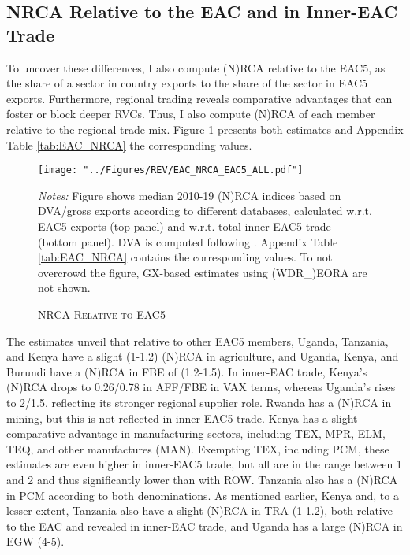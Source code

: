 \documentclass[a4paper]{article}
\begin{document}
\subsection{NRCA Relative to the EAC and in Inner-EAC Trade}

To uncover these differences, I also compute (N)RCA relative to the EAC5, as the share of a sector in country exports to the share of the sector in EAC5 exports. Furthermore, regional trading reveals comparative advantages that can foster or block deeper RVCs. Thus, I also compute (N)RCA of each member relative to the regional trade mix. Figure \ref{fig:EAC_NRCA} presents both estimates and Appendix Table \ref{tab:EAC_NRCA} the corresponding values. 

\begin{figure}[h!]
\centering
\caption{\label{fig:EAC_NRCA}\textsc{NRCA Relative to EAC5}}
\texttt{[image: "../Figures/REV/EAC\_NRCA\_EAC5\_ALL.pdf"]} \\
\raggedright
\scriptsize
\emph{Notes:} Figure shows median 2010-19 (N)RCA indices based on DVA/gross exports according to different databases, calculated w.r.t. EAC5 exports (top panel) and w.r.t. total inner EAC5 trade (bottom panel). DVA is computed following \citet{borin2019measuring}. Appendix Table \ref{tab:EAC_NRCA} contains the corresponding values. To not overcrowd the figure, GX-based estimates using (WDR\_)EORA are not shown.
\end{figure}
\FloatBarrier

The estimates unveil that relative to other EAC5 members, Uganda, Tanzania, and Kenya have a slight (1-1.2) (N)RCA in agriculture, and Uganda, Kenya, and Burundi have a (N)RCA in FBE of (1.2-1.5). In inner-EAC trade, Kenya's (N)RCA drops to 0.26/0.78 in AFF/FBE in VAX terms, whereas Uganda's rises to 2/1.5, reflecting its stronger regional supplier role. Rwanda has a (N)RCA in mining, but this is not reflected in inner-EAC5 trade. Kenya has a slight comparative advantage in manufacturing sectors, including TEX, MPR, ELM, TEQ, and other manufactures (MAN). Exempting TEX, including PCM, these estimates are even higher in inner-EAC5 trade, but all are in the range between 1 and 2 and thus significantly lower than with ROW. Tanzania also has a (N)RCA in PCM according to both denominations. As mentioned earlier, Kenya and, to a lesser extent, Tanzania also have a slight (N)RCA in TRA (1-1.2), both relative to the EAC and revealed in inner-EAC trade, and Uganda has a large (N)RCA in EGW (4-5). \newline
\end{document}
